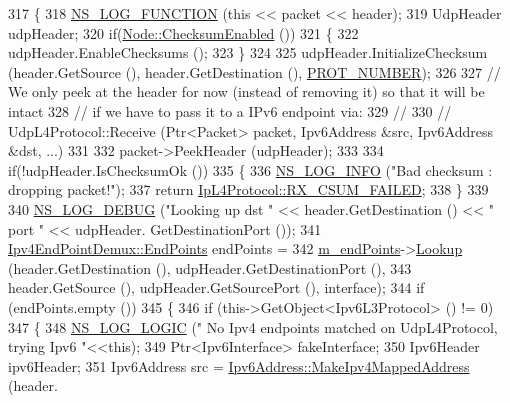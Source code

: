 \begin{DoxyCode}
317 \{
318   \hyperlink{log-macros-disabled_8h_a90b90d5bad1f39cb1b64923ea94c0761}{NS\_LOG\_FUNCTION} (\textcolor{keyword}{this} << packet << header);
319   UdpHeader udpHeader;
320   \textcolor{keywordflow}{if}(\hyperlink{classns3_1_1Node_a0515bfe9a3aeb6605d657ba855699815}{Node::ChecksumEnabled} ())
321     \{
322       udpHeader.EnableChecksums ();
323     \}
324 
325   udpHeader.InitializeChecksum (header.GetSource (), header.GetDestination (), 
      \hyperlink{classns3_1_1UdpL4Protocol_ad370801b3d1a166e831020a777c41047}{PROT\_NUMBER});
326 
327   \textcolor{comment}{// We only peek at the header for now (instead of removing it) so that it will be intact}
328   \textcolor{comment}{// if we have to pass it to a IPv6 endpoint via:}
329   \textcolor{comment}{// }
330   \textcolor{comment}{//   UdpL4Protocol::Receive (Ptr<Packet> packet, Ipv6Address &src, Ipv6Address &dst, ...)}
331 
332   packet->PeekHeader (udpHeader);
333 
334   \textcolor{keywordflow}{if}(!udpHeader.IsChecksumOk ())
335     \{
336       \hyperlink{group__logging_gafbd73ee2cf9f26b319f49086d8e860fb}{NS\_LOG\_INFO} (\textcolor{stringliteral}{"Bad checksum : dropping packet!"});
337       \textcolor{keywordflow}{return} \hyperlink{classns3_1_1IpL4Protocol_afd3744c89902fff232e2fd45f558c80eaba0111c02656760e18ca30479e297b07}{IpL4Protocol::RX\_CSUM\_FAILED};
338     \}
339 
340   \hyperlink{group__logging_ga413f1886406d49f59a6a0a89b77b4d0a}{NS\_LOG\_DEBUG} (\textcolor{stringliteral}{"Looking up dst "} << header.GetDestination () << \textcolor{stringliteral}{" port "} << udpHeader.
      GetDestinationPort ()); 
341   \hyperlink{classns3_1_1Ipv4EndPointDemux_a506a9661c08e2a64dab09ad6613d3b45}{Ipv4EndPointDemux::EndPoints} endPoints =
342     \hyperlink{classns3_1_1UdpL4Protocol_a3bde93d3afb318d7e0b4a7b3d3a58e7c}{m\_endPoints}->\hyperlink{classns3_1_1Ipv4EndPointDemux_acd458004b74ea330e9025ab874f2c1b1}{Lookup} (header.GetDestination (), udpHeader.GetDestinationPort (),
343                          header.GetSource (), udpHeader.GetSourcePort (), interface);
344   \textcolor{keywordflow}{if} (endPoints.empty ())
345     \{
346       \textcolor{keywordflow}{if} (this->GetObject<Ipv6L3Protocol> () != 0)
347         \{
348           \hyperlink{group__logging_ga88acd260151caf2db9c0fc84997f45ce}{NS\_LOG\_LOGIC} (\textcolor{stringliteral}{"  No Ipv4 endpoints matched on UdpL4Protocol, trying Ipv6 "}<<\textcolor{keyword}{this});
349           Ptr<Ipv6Interface> fakeInterface;
350           Ipv6Header ipv6Header;
351           Ipv6Address src = \hyperlink{classns3_1_1Ipv6Address_ae2db372827002d9791dec4edb6925021}{Ipv6Address::MakeIpv4MappedAddress} (header.

\end{DoxyCode}
